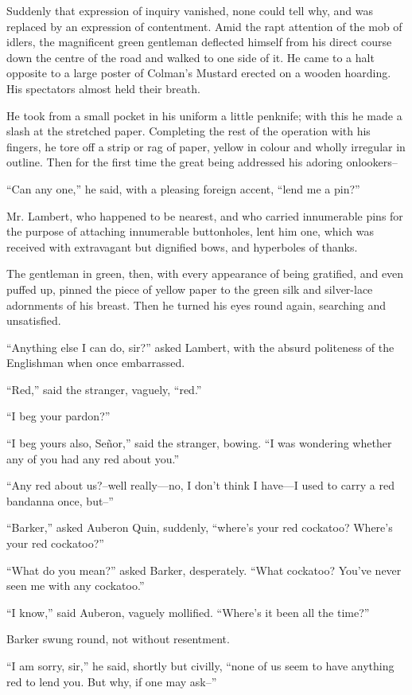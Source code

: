\documentclass{book}
\begin{document}
Suddenly that expression of inquiry vanished, none could tell why, and was replaced by an expression of contentment. Amid the rapt attention of the mob of idlers, the magnificent green gentleman deflected himself from his direct course down the centre of the road and walked to one side of it. He came to a halt opposite to a large poster of Colman’s Mustard erected on a wooden hoarding. His spectators almost held their breath.

He took from a small pocket in his uniform a little penknife; with this he made a slash at the stretched paper. Completing the rest of the operation with his fingers, he tore off a strip or rag of paper, yellow in colour and wholly irregular in outline. Then for the first time the great being addressed his adoring onlookers–

“Can any one,” he said, with a pleasing foreign accent, “lend me a pin?”

Mr. Lambert, who happened to be nearest, and who carried innumerable pins for the purpose of attaching innumerable buttonholes, lent him one, which was received with extravagant but dignified bows, and hyperboles of thanks.

The gentleman in green, then, with every appearance of being gratified, and even puffed up, pinned the piece of yellow paper to the green silk and silver-lace adornments of his breast. Then he turned his eyes round again, searching and unsatisfied.

“Anything else I can do, sir?” asked Lambert, with the absurd politeness of the Englishman when once embarrassed.

“Red,” said the stranger, vaguely, “red.”

“I beg your pardon?”

“I beg yours also, Señor,” said the stranger, bowing. “I was wondering whether any of you had any red about you.”

“Any red about us?–well really—no, I don’t think I have—I used to carry a red bandanna once, but–”

“Barker,” asked Auberon Quin, suddenly, “where’s your red cockatoo? Where’s your red cockatoo?”

“What do you mean?” asked Barker, desperately. “What cockatoo? You’ve never seen me with any cockatoo.”

“I know,” said Auberon, vaguely mollified. “Where’s it been all the time?”

Barker swung round, not without resentment.

“I am sorry, sir,” he said, shortly but civilly, “none of us seem to have anything red to lend you. But why, if one may ask–”
\end{document}
